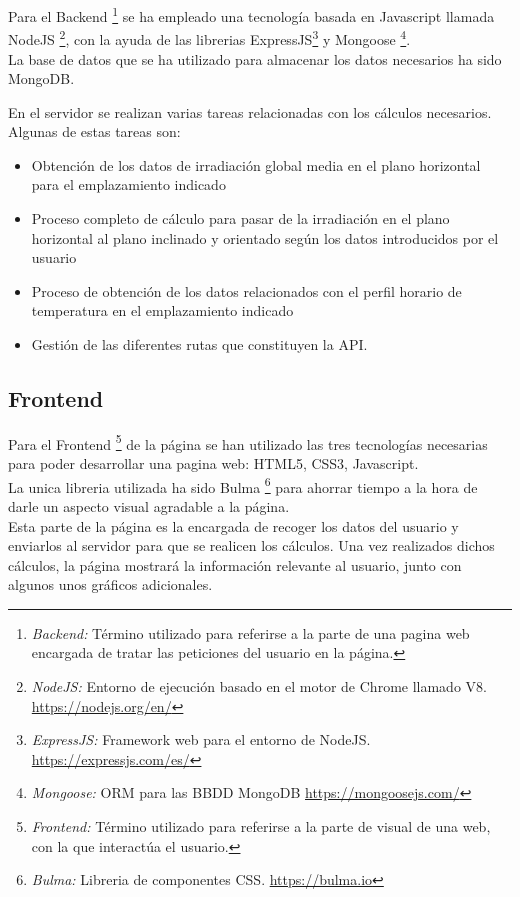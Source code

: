 \documentclass[11pt]{report}
\begin{document}
Para el Backend \footnote{\textit{Backend:} Término utilizado para referirse a la parte de una pagina web encargada de tratar las peticiones del usuario en la página.} se ha empleado una tecnología basada en Javascript llamada NodeJS \footnote{\textit{NodeJS:} Entorno de ejecución basado en el motor de Chrome llamado V8. \url{https://nodejs.org/en/} }, con la ayuda de las librerias ExpressJS\footnote{\textit{ExpressJS:} Framework web para el entorno de NodeJS. \url{https://expressjs.com/es/}} y Mongoose \footnote{\textit{Mongoose:} ORM para las BBDD MongoDB \url{https://mongoosejs.com/}}.   \\
La base de datos que se ha utilizado para almacenar los datos necesarios ha sido MongoDB.

En el servidor se realizan varias tareas relacionadas con los cálculos necesarios. Algunas de estas tareas son:
\begin{itemize}
\item Obtención de los datos de irradiación global media en el plano horizontal para el emplazamiento indicado
\item Proceso completo de cálculo para pasar de la irradiación en el plano horizontal al plano inclinado y orientado según los datos introducidos por el usuario
\item Proceso de obtención de los datos relacionados con el perfil horario de temperatura en el emplazamiento indicado
\item Gestión de las diferentes rutas que constituyen la API.
\end{itemize}

\subsection{Frontend}
 Para el Frontend \footnote{\textit{Frontend:} Término utilizado para referirse a la parte de visual de una web, con la que interactúa el usuario.} de la página se han utilizado las tres tecnologías necesarias para poder desarrollar una pagina web: HTML5, CSS3, Javascript.\\
 
La unica libreria utilizada ha sido Bulma \footnote{\textit{Bulma:} Libreria de componentes CSS. \url{https://bulma.io}} para ahorrar tiempo a la hora de darle un aspecto visual agradable a la página.\\

Esta parte de la página es la encargada de recoger los datos del usuario  y enviarlos al servidor para que se realicen los cálculos. Una vez realizados dichos cálculos, la página mostrará la información relevante al usuario, junto con algunos unos gráficos adicionales.\\
\end{document}
